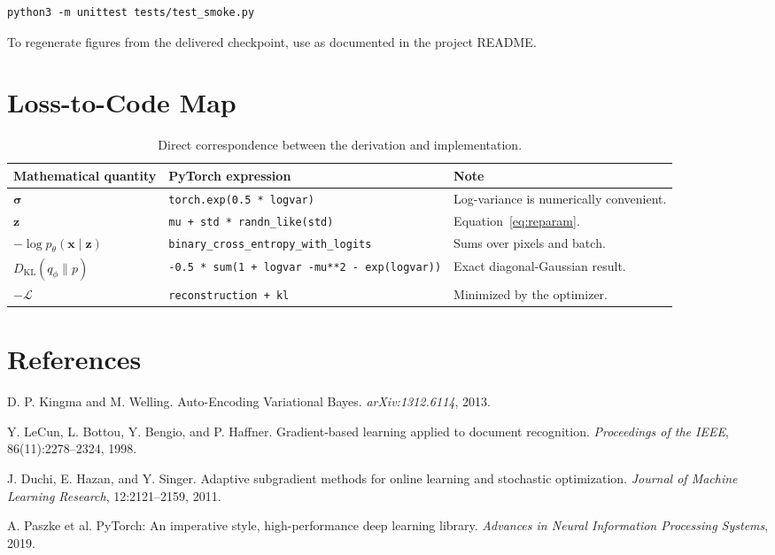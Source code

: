 \documentclass[11pt]{article}
\newcommand{\KL}{D_{\mathrm{KL}}}
\newcommand{\code}[1]{\texttt{#1}}
\begin{document}
\begin{lstlisting}[style=pythonstyle]
python3 -m unittest tests/test_smoke.py
\end{lstlisting}

To regenerate figures from the delivered checkpoint, use  as documented in the project README.

\section{Loss-to-Code Map}

\begin{table}[H]
\centering
\caption{Direct correspondence between the derivation and implementation.}
\begin{tabularx}{\textwidth}{@{}p{}p{}X@{}}
\toprule
Mathematical quantity & PyTorch expression & Note \\
\midrule
$\bm{\sigma}$ & \code{torch.exp(0.5 * logvar)} & Log-variance is numerically convenient. \\
$\bm{z}$ & \code{mu + std * randn\_like(std)} & Equation~\eqref{eq:reparam}. \\
$-\log p_\theta(\bm{x}\mid\bm{z})$ & \code{binary\_cross\_entropy}\newline\code{\_with\_logits} & Sums over pixels and batch. \\
$\KL(q_\phi\|p)$ & \code{-0.5 * sum(1 + logvar -}\newline\code{mu**2 - exp(logvar))} & Exact diagonal-Gaussian result. \\
$-\mathcal{L}$ & \code{reconstruction + kl} & Minimized by the optimizer. \\
\bottomrule
\end{tabularx}
\end{table}

\section{References}

\begin{thebibliography}{9}

D. P. Kingma and M. Welling.
\newblock Auto-Encoding Variational Bayes.
\newblock \emph{arXiv:1312.6114}, 2013.

Y. LeCun, L. Bottou, Y. Bengio, and P. Haffner.
\newblock Gradient-based learning applied to document recognition.
\newblock \emph{Proceedings of the IEEE}, 86(11):2278--2324, 1998.

J. Duchi, E. Hazan, and Y. Singer.
\newblock Adaptive subgradient methods for online learning and stochastic optimization.
\newblock \emph{Journal of Machine Learning Research}, 12:2121--2159, 2011.

A. Paszke et al.
\newblock PyTorch: An imperative style, high-performance deep learning library.
\newblock \emph{Advances in Neural Information Processing Systems}, 2019.

\end{thebibliography}
\end{document}
